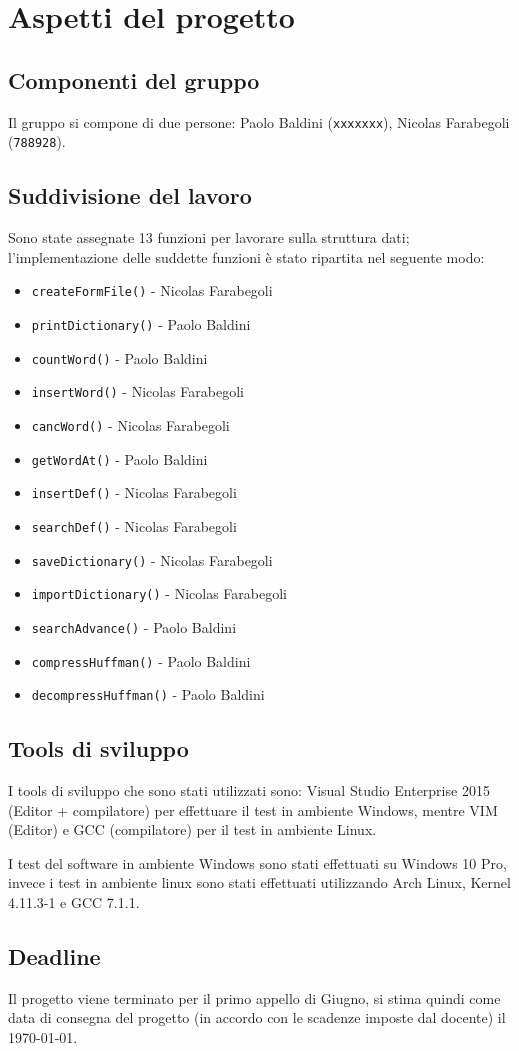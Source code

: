 \documentclass[paper=a4, fontsize=11pt,twoside]{scrartcl}   %
\begin{document}
		\section{Aspetti del progetto}
			\subsection{Componenti del gruppo}
				Il gruppo si compone di due persone: Paolo Baldini (\texttt{xxxxxxx}), Nicolas Farabegoli (\texttt{788928}).
			\subsection{Suddivisione del lavoro}
				Sono state assegnate 13 funzioni per lavorare sulla struttura dati; l'implementazione delle suddette funzioni è stato ripartita nel seguente modo:
				\begin{itemize}
					\item \texttt{createFormFile()} - Nicolas Farabegoli
					\item \texttt{printDictionary()} - Paolo Baldini
					\item \texttt{countWord()} - Paolo Baldini
					\item \texttt{insertWord()} - Nicolas Farabegoli
					\item \texttt{cancWord()} - Nicolas Farabegoli
					\item \texttt{getWordAt()} - Paolo Baldini
					\item \texttt{insertDef()} - Nicolas Farabegoli
					\item \texttt{searchDef()} - Nicolas Farabegoli
					\item \texttt{saveDictionary()} - Nicolas Farabegoli
					\item \texttt{importDictionary()} - Nicolas Farabegoli
					\item \texttt{searchAdvance()} - Paolo Baldini
					\item \texttt{compressHuffman()} - Paolo Baldini
					\item \texttt{decompressHuffman()} - Paolo Baldini			
				\end{itemize}
			 
			 \subsection{Tools di sviluppo}
			 	I tools di sviluppo che sono stati utilizzati sono: Visual Studio Enterprise 2015 (Editor + compilatore) per effettuare il test in ambiente Windows, mentre VIM (Editor) e GCC (compilatore) per il test in ambiente Linux.
			 	
			 	I test del software in ambiente Windows sono stati effettuati su Windows 10 Pro, invece i test in ambiente linux sono stati effettuati utilizzando Arch Linux, Kernel 4.11.3-1 e GCC 7.1.1.
			 \subsection{Deadline}
			 	Il progetto viene terminato per il primo appello di Giugno, si stima quindi come data di consegna del progetto (in accordo con le scadenze imposte dal docente) il \today.
			 
			 
			 
		 
\end{document}
